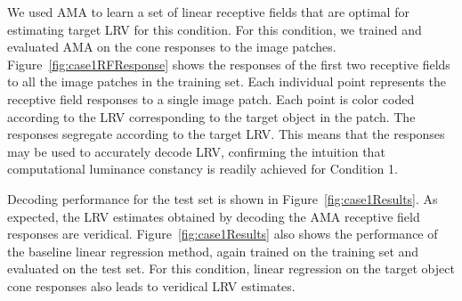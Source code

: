 \documentclass{jov}
\begin{document}
We used AMA to learn a set of linear receptive fields that are optimal for estimating target LRV for this condition.
For this condition, we trained and evaluated AMA on the cone responses to the image patches.
Figure~\ref{fig:case1RFResponse} shows the responses of the first two receptive fields to all the image patches in the training set.
Each individual point represents the receptive field responses to a single image patch.
Each point is color coded according to the LRV corresponding to the target object in the patch.
The responses segregate according to the target LRV.
This means that the responses may be used to accurately decode LRV, confirming the intuition that computational
luminance constancy is readily achieved for Condition 1.

Decoding performance for the test set is shown in Figure~\ref{fig:case1Results}.
As expected, the LRV estimates obtained by decoding the AMA receptive field responses are veridical.
Figure~\ref{fig:case1Results} also shows the performance of the baseline linear regression method, again trained
on the training set and evaluated on the test set.
For this condition, linear regression on the target object cone responses also leads to veridical LRV estimates.
\end{document}
